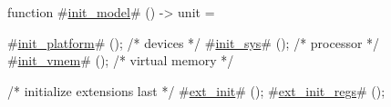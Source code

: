 function #\hyperref[sailRISCVzinitzymodel]{init\_model}# () -> unit = {
  #\hyperref[sailRISCVzinitzyplatform]{init\_platform}# (); /* devices */
  #\hyperref[sailRISCVzinitzysys]{init\_sys}# ();      /* processor */
  #\hyperref[sailRISCVzinitzyvmem]{init\_vmem}# ();     /* virtual memory */

  /* initialize extensions last */
  #\hyperref[sailRISCVzextzyinit]{ext\_init}# ();
  #\hyperref[sailRISCVzextzyinitzyregs]{ext\_init\_regs}# ();
}
